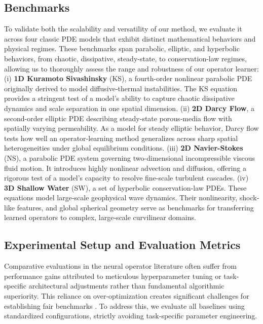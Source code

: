\documentclass[final,3p,times]{elsarticle}
\begin{document}
\subsection{Benchmarks}
To validate both the scalability and versatility of our method, we evaluate it across four classic PDE models that exhibit distinct mathematical behaviors and physical regimes. These benchmarks span parabolic, elliptic, and hyperbolic behaviors, from chaotic, dissipative, steady-state, to conservation-law regimes, allowing us to thoroughly assess the range and robustness of our operator learner:
(i) \textbf{1D Kuramoto Sivashinsky} (KS), a fourth-order nonlinear parabolic PDE originally derived to model diffusive‑thermal instabilities. The KS equation provides a stringent test of a model’s ability to capture chaotic dissipative dynamics and scale separation in one spatial dimension.
(ii) \textbf{2D Darcy Flow}, a second-order elliptic PDE describing steady-state porous‑media flow with spatially varying permeability. As a model for steady elliptic behavior, Darcy flow tests how well an operator‑learning method generalizes across sharp spatial heterogeneities under global equilibrium conditions.
(iii) \textbf{2D Navier-Stokes} (NS), a parabolic PDE system governing two-dimensional incompressible viscous fluid motion. It introduces highly nonlinear advection and diffusion, offering a rigorous test of a model's capacity to resolve fine-scale turbulent cascades.
(iv) \textbf{3D Shallow Water} (SW), a set of hyperbolic conservation‑law PDEs. These equations model large‑scale geophysical wave dynamics. Their nonlinearity, shock‐like features, and global spherical geometry serve as benchmarks for transferring learned operators to complex, large‑scale curvilinear domains.

\subsection{Experimental Setup and Evaluation Metrics}\label{sec:experimental_setup}
Comparative evaluations in the neural operator literature often suffer from performance gains attributed to meticulous hyperparameter tuning or task-specific architectural adjustments rather than fundamental algorithmic superiority. This reliance on over-optimization creates significant challenges for establishing fair benchmarks \cite{mcgreivy2024weak}. To address this, we evaluate all baselines using standardized configurations, strictly avoiding task-specific parameter engineering.
\end{document}
